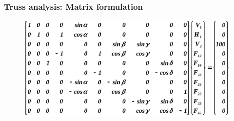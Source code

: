 \documentclass[notes]{beamer}
\begin{document}
\begin{frame}
	\frametitle{Truss analysis: Matrix formulation}
	\begin{figure}[ht]
		\centering
		\includegraphics[width=\textwidth]{figs/truss-matrix.png}
	\end{figure}
\end{frame}
\end{document}
